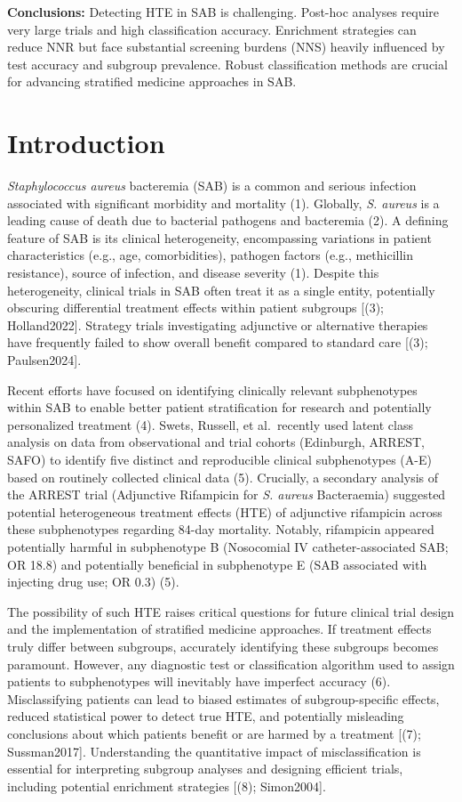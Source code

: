 \documentclass[
  letterpaper,
  DIV=11,
  numbers=noendperiod]{scrartcl}
\begin{document}
\textbf{Conclusions:} Detecting HTE in SAB is challenging. Post-hoc
analyses require very large trials and high classification accuracy.
Enrichment strategies can reduce NNR but face substantial screening
burdens (NNS) heavily influenced by test accuracy and subgroup
prevalence. Robust classification methods are crucial for advancing
stratified medicine approaches in SAB.

\section{Introduction}\label{introduction}

\emph{Staphylococcus aureus} bacteremia (SAB) is a common and serious
infection associated with significant morbidity and mortality (1).
Globally, \emph{S. aureus} is a leading cause of death due to bacterial
pathogens and bacteremia (2). A defining feature of SAB is its clinical
heterogeneity, encompassing variations in patient characteristics (e.g.,
age, comorbidities), pathogen factors (e.g., methicillin resistance),
source of infection, and disease severity (1). Despite this
heterogeneity, clinical trials in SAB often treat it as a single entity,
potentially obscuring differential treatment effects within patient
subgroups {[}(3); Holland2022{]}. Strategy trials investigating
adjunctive or alternative therapies have frequently failed to show
overall benefit compared to standard care {[}(3); Paulsen2024{]}.

Recent efforts have focused on identifying clinically relevant
subphenotypes within SAB to enable better patient stratification for
research and potentially personalized treatment (4). Swets, Russell, et
al.~recently used latent class analysis on data from observational and
trial cohorts (Edinburgh, ARREST, SAFO) to identify five distinct and
reproducible clinical subphenotypes (A-E) based on routinely collected
clinical data (5). Crucially, a secondary analysis of the ARREST trial
(Adjunctive Rifampicin for \emph{S. aureus} Bacteraemia) suggested
potential heterogeneous treatment effects (HTE) of adjunctive rifampicin
across these subphenotypes regarding 84-day mortality. Notably,
rifampicin appeared potentially harmful in subphenotype B (Nosocomial IV
catheter-associated SAB; OR 18.8) and potentially beneficial in
subphenotype E (SAB associated with injecting drug use; OR 0.3) (5).

The possibility of such HTE raises critical questions for future
clinical trial design and the implementation of stratified medicine
approaches. If treatment effects truly differ between subgroups,
accurately identifying these subgroups becomes paramount. However, any
diagnostic test or classification algorithm used to assign patients to
subphenotypes will inevitably have imperfect accuracy (6).
Misclassifying patients can lead to biased estimates of
subgroup-specific effects, reduced statistical power to detect true HTE,
and potentially misleading conclusions about which patients benefit or
are harmed by a treatment {[}(7); Sussman2017{]}. Understanding the
quantitative impact of misclassification is essential for interpreting
subgroup analyses and designing efficient trials, including potential
enrichment strategies {[}(8); Simon2004{]}.
\end{document}
